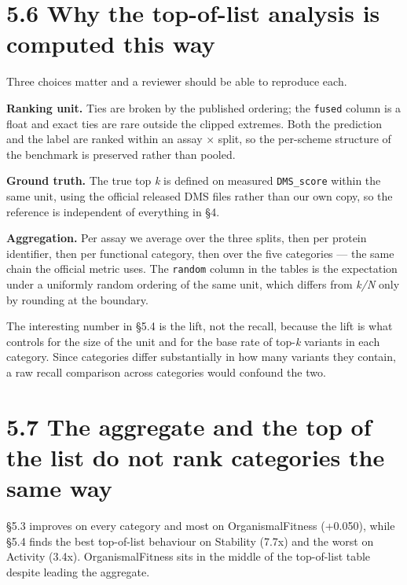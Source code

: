 \documentclass[sigconf,review,nonacm]{acmart}
\begin{document}
\hypertarget{why-the-top-of-list-analysis-is-computed-this-way}{%
\section{5.6 Why the top-of-list analysis is computed this way}\label{why-the-top-of-list-analysis-is-computed-this-way}}

Three choices matter and a reviewer should be able to reproduce each.

\textbf{Ranking unit.} Ties are broken by the published ordering; the \texttt{fused} column is a float and exact
ties are rare outside the clipped extremes. Both the prediction and the label are ranked within an
assay × split, so the per-scheme structure of the benchmark is preserved rather than pooled.

\textbf{Ground truth.} The true top \emph{k} is defined on measured \texttt{DMS\_score} within the same unit, using the
official released DMS files rather than our own copy, so the reference is independent of everything in
§4.

\textbf{Aggregation.} Per assay we average over the three splits, then per protein identifier, then per
functional category, then over the five categories --- the same chain the official metric uses. The
\texttt{random} column in the tables is the expectation under a uniformly random ordering of the same unit,
which differs from \emph{k/N} only by rounding at the boundary.

The interesting number in §5.4 is the lift, not the recall, because the lift is what controls for the
size of the unit and for the base rate of top-\emph{k} variants in each category. Since categories differ
substantially in how many variants they contain, a raw recall comparison across categories would
confound the two.

\hypertarget{the-aggregate-and-the-top-of-the-list-do-not-rank-categories-the-same-way}{%
\section{5.7 The aggregate and the top of the list do not rank categories the same way}\label{the-aggregate-and-the-top-of-the-list-do-not-rank-categories-the-same-way}}

§5.3 improves on every category and most on OrganismalFitness (+0.050), while §5.4 finds the best
top-of-list behaviour on Stability (7.7x) and the worst on Activity (3.4x). OrganismalFitness sits in
the middle of the top-of-list table despite leading the aggregate.
\end{document}
